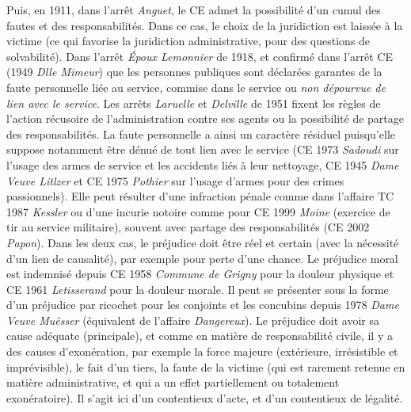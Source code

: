 \documentclass[math]{cours}
\begin{document}
Puis, en 1911, dans l'arrêt \emph{Anguet}, le CE admet la possibilité d'un cumul des fautes et des responsabilités. Dans ce cas, le choix de la juridiction est laissée à la victime (ce qui favorise la juridiction administrative, pour des questions de solvabilité).
Dans l'arrêt \emph{Époux Lemonnier} de 1918, et confirmé dans l'arrêt CE (1949 \emph{Dlle Mimeur}) que les personnes publiques sont déclarées garantes de la faute personnelle liée au service, commise dans le service ou \emph{non dépourvue de lien avec le service}.
Les arrêts \emph{Laruelle} et \emph{Delville} de 1951 fixent les règles de l'action récusoire de l'administration contre ses agents ou la possibilité de partage des responsabilités.
La faute personnelle a ainsi un caractère résiduel puisqu'elle suppose notamment être dénué de tout lien avec le service (CE 1973 \emph{Sadoudi} sur l'usage des armes de service et les accidents liés à leur nettoyage, CE 1945 \emph{Dame Veuve Litlzer} et CE 1975 \emph{Pothier} sur l'usage d'armes pour des crimes passionnels).
Elle peut résulter d'une infraction pénale comme dans l'affaire TC 1987 \emph{Kessler} ou d'une incurie notoire comme pour CE 1999 \emph{Moine} (exercice de tir au service militaire), souvent avec partage des responsabilités (CE 2002 \emph{Papon}).
Dans les deux cas, le préjudice doit être réel et certain (avec la nécessité d'un lien de causalité), par exemple pour perte d'une chance.
Le préjudice moral est indemnisé depuis CE 1958 \emph{Commune de Grigny} pour la douleur physique et CE 1961 \emph{Letisserand} pour la douleur morale.
Il peut se présenter sous la forme d'un préjudice par ricochet pour les conjoints et les concubins depuis 1978 \emph{Dame Veuve Muësser} (équivalent de l'affaire \emph{Dangereux}).
Le préjudice doit avoir sa cause adéquate (principale), et comme en matière de responsabilité civile, il y a des causes d'exonération, par exemple la force majeure (extérieure, irrésistible et imprévisible), le fait d'un tiers, la faute de la victime (qui est rarement retenue en matière administrative, et qui a un effet partiellement ou totalement exonératoire).
Il s'agit ici d'un contentieux d'acte, et d'un contentieux de légalité.
\end{document}
